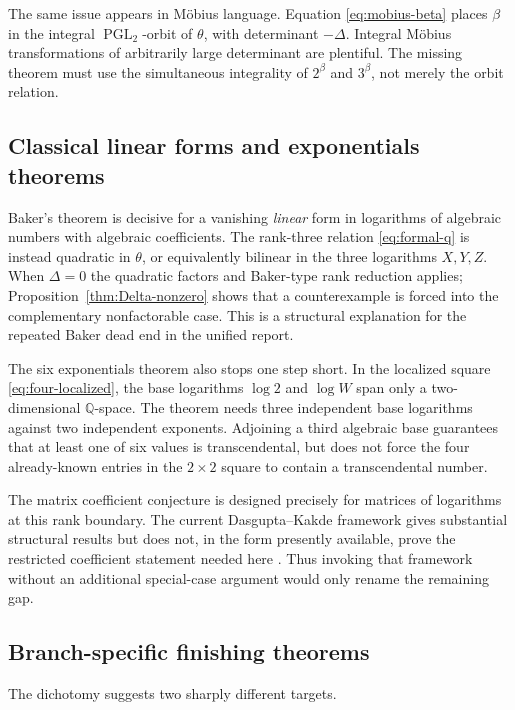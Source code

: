 \documentclass[11pt,oneside]{article}
\theoremstyle{research}
\theoremstyle{definition}
\newcommand{\Q}{\mathbb Q}
\begin{document}
The same issue appears in M\"obius language.  Equation
\eqref{eq:mobius-beta} places $\beta$ in the integral
$\operatorname{PGL}_2$-orbit of $\theta$, with determinant $-\Delta$.
Integral M\"obius transformations of arbitrarily large determinant are
plentiful.  The missing theorem must use the simultaneous integrality of
$2^\beta$ and $3^\beta$, not merely the orbit relation.

\subsection{Classical linear forms and exponentials theorems}

Baker's theorem is decisive for a vanishing \emph{linear} form in logarithms
of algebraic numbers with algebraic coefficients.  The rank-three relation
\eqref{eq:formal-q} is instead quadratic in $\theta$, or equivalently bilinear
in the three logarithms $X,Y,Z$.  When $\Delta=0$ the quadratic factors and
Baker-type rank reduction applies; Proposition~\ref{thm:Delta-nonzero} shows
that a counterexample is forced into the complementary nonfactorable case.
This is a structural explanation for the repeated Baker dead end in the
unified report.

The six exponentials theorem also stops one step short.  In the localized
square \eqref{eq:four-localized}, the base logarithms $\log2$ and $\log W$
span only a two-dimensional $\Q$-space.  The theorem needs three independent
base logarithms against two independent exponents.  Adjoining a third
algebraic base guarantees that at least one of six values is transcendental,
but does not force the four already-known entries in the $2\times2$ square to
contain a transcendental number.

The matrix coefficient conjecture is designed precisely for matrices of
logarithms at this rank boundary.  The current Dasgupta--Kakde framework gives
substantial structural results but does not, in the form presently available,
prove the restricted coefficient statement needed here
\cite{DasguptaKakde2026}.  Thus invoking that framework without an additional
special-case argument would only rename the remaining gap.

\subsection{Branch-specific finishing theorems}

The dichotomy suggests two sharply different targets.
\end{document}
